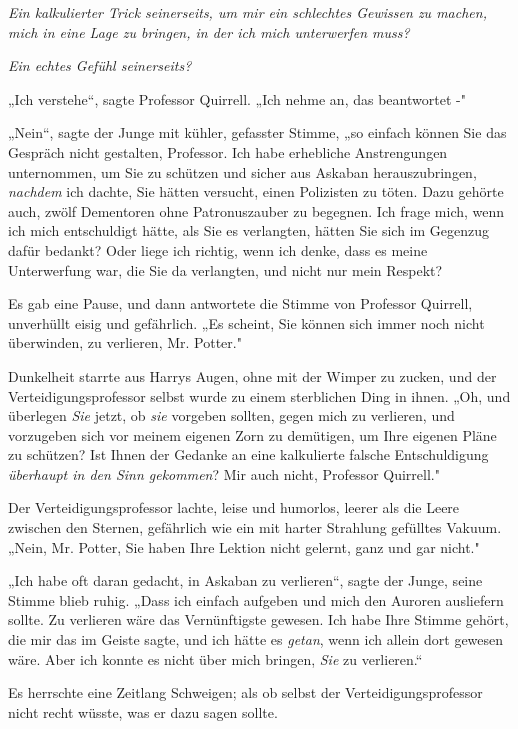 {\emph{\emph{Ein kalkulierter Trick seinerseits, um mir ein schlechtes Gewissen zu machen, mich in eine Lage zu bringen, in der ich mich unterwerfen muss?}}

\emph{\emph{Ein echtes Gefühl seinerseits?}}

„Ich verstehe“, sagte Professor Quirrell. „Ich nehme an, das beantwortet -"

„Nein“, sagte der Junge mit kühler, gefasster Stimme, „so einfach können Sie das Gespräch nicht gestalten, Professor. Ich habe erhebliche Anstrengungen unternommen, um Sie zu schützen und sicher aus Askaban herauszubringen, \emph{nachdem} ich dachte, Sie hätten versucht, einen Polizisten zu töten. Dazu gehörte auch, zwölf Dementoren ohne Patronuszauber zu begegnen. Ich frage mich, wenn ich mich entschuldigt hätte, als Sie es verlangten, hätten Sie sich im Gegenzug dafür bedankt? Oder liege ich richtig, wenn ich denke, dass es meine Unterwerfung war, die Sie da verlangten, und nicht nur mein Respekt?

Es gab eine Pause, und dann antwortete die Stimme von Professor Quirrell, unverhüllt eisig und gefährlich. „Es scheint, Sie können sich immer noch nicht überwinden, zu verlieren, Mr. Potter."

Dunkelheit starrte aus Harrys Augen, ohne mit der Wimper zu zucken, und der Verteidigungsprofessor selbst wurde zu einem sterblichen Ding in ihnen. „Oh, und überlegen \emph{Sie} jetzt, ob \emph{sie} vorgeben sollten, gegen mich zu verlieren, und vorzugeben sich vor meinem eigenen Zorn zu demütigen, um Ihre eigenen Pläne zu schützen? Ist Ihnen der Gedanke an eine kalkulierte falsche Entschuldigung \emph{überhaupt in den Sinn gekommen}? Mir auch nicht, Professor Quirrell."

Der Verteidigungsprofessor lachte, leise und humorlos, leerer als die Leere zwischen den Sternen, gefährlich wie ein mit harter Strahlung gefülltes Vakuum. „Nein, Mr. Potter, Sie haben Ihre Lektion nicht gelernt, ganz und gar nicht."

„Ich habe oft daran gedacht, in Askaban zu verlieren“, sagte der Junge, seine Stimme blieb ruhig. „Dass ich einfach aufgeben und mich den Auroren ausliefern sollte. Zu verlieren wäre das Vernünftigste gewesen. Ich habe Ihre Stimme gehört, die mir das im Geiste sagte, und ich hätte es \emph{getan}, wenn ich allein dort gewesen wäre. Aber ich konnte es nicht über mich bringen, \emph{Sie} zu verlieren.“

Es herrschte eine Zeitlang Schweigen; als ob selbst der Verteidigungsprofessor nicht recht wüsste, was er dazu sagen sollte.

}
